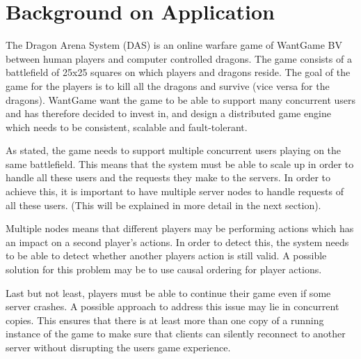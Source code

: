 \section{Background on Application }


The Dragon Arena System (DAS) is an online warfare game of WantGame BV between human players and computer controlled dragons.
The game consists of a battlefield of 25x25 squares on which players and dragons reside.
The goal of the game for the players is to kill all the dragons and survive (vice versa for the dragons).
WantGame want the game to be able to support many concurrent users and has therefore decided to invest in, and design a distributed game engine which needs to be consistent, scalable and fault-tolerant. 

As stated, the game needs to support multiple concurrent users playing on the same battlefield. 
This means that the system must be able to scale up in order to handle all these users and the requests they make to the servers. 
In order to achieve this, it is important to have multiple server nodes to handle requests of all these users. 
(This will be explained in more detail in the next section).

Multiple nodes means that different players may be performing actions which has an impact on a second player's actions.
In order to detect this, the system needs to be able to detect whether another players action is still valid. 
A possible solution for this problem may be to use causal ordering for player actions.

Last but not least, players must be able to continue their game even if some server crashes. 
A possible approach to address this issue may lie in concurrent copies. This ensures that there is at least more than one copy of a running instance of the game to make sure that clients can silently reconnect to another server without disrupting the users game experience. 
